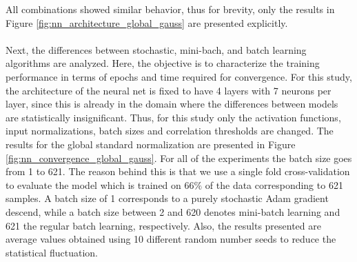 \documentclass[paper=a4, fontsize=11pt]{scrartcl} %
\begin{document}
All combinations showed similar behavior, thus for brevity, only the results in Figure \ref{fig:nn_architecture_global_gauss} are presented explicitly.
\\
\\
Next, the differences between stochastic, mini-bach, and batch learning algorithms are analyzed.
Here, the objective is to characterize the training performance in terms of epochs and time required for convergence. 
For this study, the architecture of the neural net is fixed to have 4 layers with 7 neurons per layer, since this is already in the domain where the differences between models are statistically insignificant.
Thus, for this study only the activation functions, input normalizations, batch sizes and correlation thresholds are changed.
The results for the global standard normalization are presented in Figure \ref{fig:nn_convergence_global_gauss}.
For all of the experiments the batch size goes from 1 to 621.
The reason behind this is that we use a single fold cross-validation to evaluate the model which is trained on $66\%$ of the data corresponding to 621 samples.
A batch size of 1 corresponds to a purely stochastic Adam gradient descend, while a batch size between 2 and 620 denotes mini-batch learning and 621 the regular batch learning, respectively.
Also, the results presented are average values obtained using 10 different random number seeds to reduce the statistical fluctuation.
\end{document}
